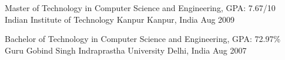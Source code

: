 
\begin{cventries}
  \cventry
    {Master of Technology in Computer Science and Engineering, GPA: 7.67/10} %
    {Indian Institute of Technology Kanpur} %
    {Kanpur, India} %
    {Aug 2009} %
    {} %
    
  \cventry
    {Bachelor of Technology in Computer Science and Engineering, GPA: 72.97\%} %
    {Guru Gobind Singh Indraprastha University} %
    {Delhi, India} %
    {Aug 2007} %
    {} %
\end{cventries}
